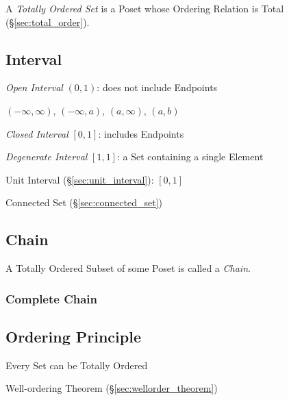 A \emph{Totally Ordered Set} is a Poset whose Ordering Relation is
Total (\S\ref{sec:total_order}).


\subsection{Interval}\label{sec:interval}

\emph{Open Interval} $(0,1)$: does not include Endpoints

$(-\infty, \infty)$, $(-\infty,a)$, $(a,\infty)$, $(a,b)$

\emph{Closed Interval} $[0,1]$: includes Endpoints

\emph{Degenerate Interval} $[1,1]$: a Set containing a single Element

Unit Interval (\S\ref{sec:unit_interval}): $[0,1]$

Connected Set (\S\ref{sec:connected_set})



\subsection{Chain}\label{sec:chain}

A Totally Ordered Subset of some Poset is called a \emph{Chain}.



\subsubsection{Complete Chain}\label{sec:complete_chain}



\subsection{Ordering Principle}\label{sec:ordering_principle}

Every Set can be Totally Ordered

Well-ordering Theorem (\S\ref{sec:wellorder_theorem})



